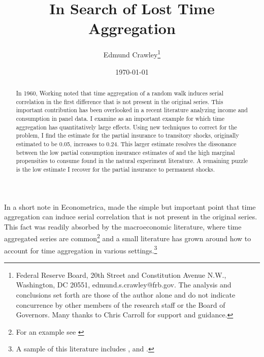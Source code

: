 \documentclass[AER]{AEA}
\begin{document}
\title{In Search of Lost Time Aggregation}
\author{Edmund Crawley\thanks{ Federal Reserve Board, 20th Street and Constitution Avenue N.W., Washington, DC 20551, edmund.s.crawley@frb.gov. The analysis and conclusions set forth are those of the author alone and do not indicate concurrence by other members of the research staff or the Board of Governors. Many thanks to Chris Carroll for support and guidance.}}
\date{\today}
\pubVolume{}
\pubIssue{}

\begin{abstract}
In 1960, Working noted that time aggregation of a random walk induces serial correlation in the first difference that is not present in the original series. This important contribution has been overlooked in a recent literature analyzing income and consumption in panel data. I examine \cite{blundell_consumption_2008} as an important example for which time aggregation has quantitatively large effects. Using new techniques to correct for the problem, I find the estimate for the partial insurance to transitory shocks, originally estimated to be 0.05, increases to 0.24. This larger estimate resolves the dissonance between the low partial consumption insurance estimates of \cite{blundell_consumption_2008} and the high marginal propensities to consume found in the natural experiment literature. A remaining puzzle is the low estimate I recover for the partial insurance to permanent shocks.
\end{abstract}


\maketitle

\newpage
In a short note in Econometrica, \cite{working_note_1960} made the simple but important point that time aggregation can induce serial correlation that is not present in the original series. This fact was readily absorbed by the macroeconomic literature, where time aggregated series are common\footnote{For an example see \cite{campbell_consumption_1989}} and a small literature has grown around how to account for time aggregation in various settings.\footnote{A sample of this literature includes \cite{amemiya_effect_1972}, \cite{weiss_systematic_1984} and \cite{drost_temporal_1993}.}
\end{document}
